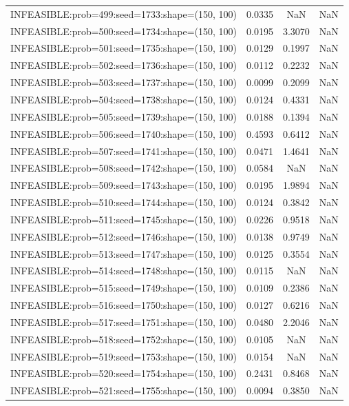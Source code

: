 \begin{longtable}{lccc}
INFEASIBLE:prob=499:seed=1733:shape=(150, 100) & 0.0335 &     NaN &    NaN \\
INFEASIBLE:prob=500:seed=1734:shape=(150, 100) & 0.0195 &  3.3070 &    NaN \\
INFEASIBLE:prob=501:seed=1735:shape=(150, 100) & 0.0129 &  0.1997 &    NaN \\
INFEASIBLE:prob=502:seed=1736:shape=(150, 100) & 0.0112 &  0.2232 &    NaN \\
INFEASIBLE:prob=503:seed=1737:shape=(150, 100) & 0.0099 &  0.2099 &    NaN \\
INFEASIBLE:prob=504:seed=1738:shape=(150, 100) & 0.0124 &  0.4331 &    NaN \\
INFEASIBLE:prob=505:seed=1739:shape=(150, 100) & 0.0188 &  0.1394 &    NaN \\
INFEASIBLE:prob=506:seed=1740:shape=(150, 100) & 0.4593 &  0.6412 &    NaN \\
INFEASIBLE:prob=507:seed=1741:shape=(150, 100) & 0.0471 &  1.4641 &    NaN \\
INFEASIBLE:prob=508:seed=1742:shape=(150, 100) & 0.0584 &     NaN &    NaN \\
INFEASIBLE:prob=509:seed=1743:shape=(150, 100) & 0.0195 &  1.9894 &    NaN \\
INFEASIBLE:prob=510:seed=1744:shape=(150, 100) & 0.0124 &  0.3842 &    NaN \\
INFEASIBLE:prob=511:seed=1745:shape=(150, 100) & 0.0226 &  0.9518 &    NaN \\
INFEASIBLE:prob=512:seed=1746:shape=(150, 100) & 0.0138 &  0.9749 &    NaN \\
INFEASIBLE:prob=513:seed=1747:shape=(150, 100) & 0.0125 &  0.3554 &    NaN \\
INFEASIBLE:prob=514:seed=1748:shape=(150, 100) & 0.0115 &     NaN &    NaN \\
INFEASIBLE:prob=515:seed=1749:shape=(150, 100) & 0.0109 &  0.2386 &    NaN \\
INFEASIBLE:prob=516:seed=1750:shape=(150, 100) & 0.0127 &  0.6216 &    NaN \\
INFEASIBLE:prob=517:seed=1751:shape=(150, 100) & 0.0480 &  2.2046 &    NaN \\
INFEASIBLE:prob=518:seed=1752:shape=(150, 100) & 0.0105 &     NaN &    NaN \\
INFEASIBLE:prob=519:seed=1753:shape=(150, 100) & 0.0154 &     NaN &    NaN \\
INFEASIBLE:prob=520:seed=1754:shape=(150, 100) & 0.2431 &  0.8468 &    NaN \\
INFEASIBLE:prob=521:seed=1755:shape=(150, 100) & 0.0094 &  0.3850 &    NaN \\

\end{longtable}
